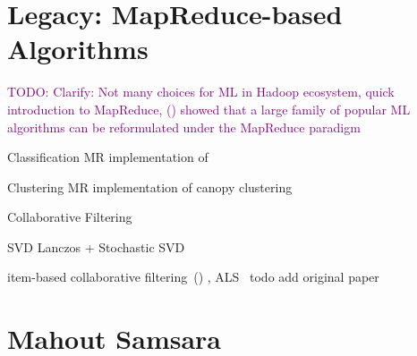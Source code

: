 \documentclass[twoside,11pt]{article}
\newcommand{\todo}[1]{\textcolor{purple}{TODO: #1}}
\begin{document}
\section{Legacy: MapReduce-based Algorithms}
\todo{Clarify: Not many choices for ML in Hadoop ecosystem, quick introduction to MapReduce, (\cite{Chu2007}) showed that a large family of popular ML algorithms can be reformulated under the MapReduce paradigm}

Classification MR implementation of~\cite{Rennie2003}

Clustering MR implementation of canopy clustering~\cite{Mccallum2000}

Collaborative Filtering

SVD Lanczos + Stochastic SVD~\cite{Halko2012}

item-based collaborative filtering~(\cite{Sarwar2001}) \cite{Dunning1993,Schelter2012,Dunning2014},
ALS~\cite{Schelter2013} todo add original paper~\cite{Zhou2008}\\

\section{Mahout Samsara}
\end{document}
